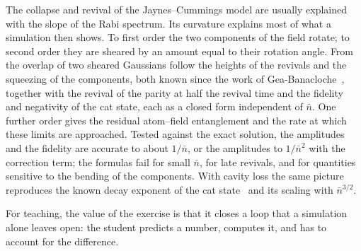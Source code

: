 \documentclass{iopjournal}
\newcommand{\nbar}{\bar{n}}
\begin{document}
The collapse and revival of the Jaynes--Cummings model are usually explained with the slope of the Rabi spectrum. Its curvature explains most of what a simulation then shows. To first order the two components of the field rotate; to second order they are sheared by an amount equal to their rotation angle. From the overlap of two sheared Gaussians follow the heights of the revivals and the squeezing of the components, both known since the work of Gea-Banacloche~\cite{gea-banacloche1991}, together with the revival of the parity at half the revival time and the fidelity and negativity of the cat state, each as a closed form independent of $\nbar$. One further order gives the residual atom--field entanglement and the rate at which these limits are approached. Tested against the exact solution, the amplitudes and the fidelity are accurate to about $1/\nbar$, or the amplitudes to $1/\nbar^2$ with the correction term; the formulas fail for small $\nbar$, for late revivals, and for quantities sensitive to the bending of the components. With cavity loss the same picture reproduces the known decay exponent of the cat state~\cite{meunier2006} and its scaling with $\nbar^{3/2}$.

For teaching, the value of the exercise is that it closes a loop that a simulation alone leaves open: the student predicts a number, computes it, and has to account for the difference.




\end{document}
